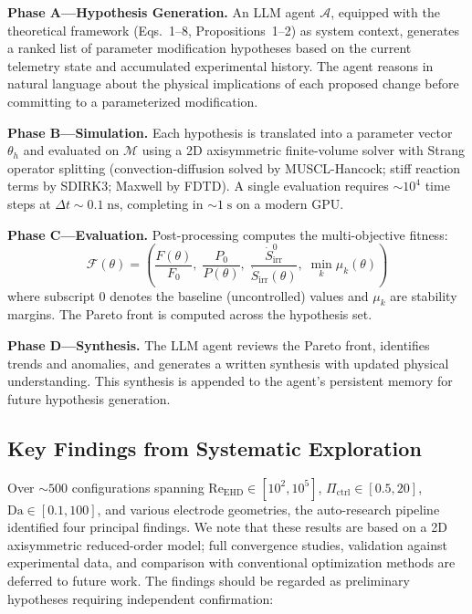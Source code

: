 \documentclass[12pt,twocolumn]{article}
\newcommand{\Sdot}{\dot{S}_{\mathrm{irr}}}
\newcommand{\Reehd}{\mathrm{Re}_{\mathrm{EHD}}}
\newcommand{\Pctrl}{\Pi_{\mathrm{ctrl}}}
\begin{document}
\textbf{Phase A---Hypothesis Generation.}
An LLM agent $\mathcal{A}$, equipped with the theoretical framework
(Eqs.~1--8, Propositions~1--2) as system context, generates a ranked
list of parameter modification hypotheses based on the current
telemetry state and accumulated experimental history. The agent
reasons in natural language about the physical implications of each
proposed change before committing to a parameterized modification.

\textbf{Phase B---Simulation.}
Each hypothesis is translated into a parameter vector $\theta_h$ and
evaluated on $\mathcal{M}$ using a 2D axisymmetric finite-volume
solver with Strang operator splitting (convection-diffusion solved
by MUSCL-Hancock; stiff reaction terms by SDIRK3; Maxwell by
FDTD). A single evaluation requires $\sim 10^4$ time steps at
$\Delta t \sim 0.1\;\mathrm{ns}$, completing in $\sim 1\;\mathrm{s}$
on a modern GPU.

\textbf{Phase C---Evaluation.}
Post-processing computes the multi-objective fitness:
\begin{equation}
  \mathcal{F}(\theta) = \left(
    \frac{F(\theta)}{F_0},\;
    \frac{P_0}{P(\theta)},\;
    \frac{\Sdot^0}{\Sdot(\theta)},\;
    \min_k \mu_k(\theta)
  \right)
  \label{eq:fitness}
\end{equation}
where subscript $0$ denotes the baseline (uncontrolled) values and
$\mu_k$ are stability margins. The Pareto front is computed across
the hypothesis set.

\textbf{Phase D---Synthesis.}
The LLM agent reviews the Pareto front, identifies trends and
anomalies, and generates a written synthesis with updated physical
understanding. This synthesis is appended to the agent's persistent
memory for future hypothesis generation.

\subsection{Key Findings from Systematic Exploration}
\label{sec:autoresearch:findings}

Over $\sim 500$ configurations spanning
$\Reehd \in [10^2, 10^5]$, $\Pctrl \in [0.5, 20]$,
$\mathrm{Da} \in [0.1, 100]$, and various electrode geometries,
the auto-research pipeline identified four principal findings.
We note that these results are based on a 2D axisymmetric
reduced-order model; full convergence studies, validation against
experimental data, and comparison with conventional optimization
methods are deferred to future work. The findings should be
regarded as preliminary hypotheses requiring independent
confirmation:
\end{document}
